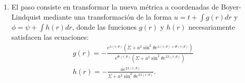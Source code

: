 \begin{enumerate}[1]
    \item El paso consiste en transformar la nueva métrica a coordenadas de Boyer-Lindquist mediante una transformación de la forma $u=t+\int g(r) d r$ y $\phi=\psi+\int h(r) d r$, donde las funciones $g(r)$ y $h(r)$ necesariamente satisfacen las ecuaciones:
        \begin{equation}
            \begin{array}{l}
            g(r)=-\frac{e^{\lambda(r, \theta)}\left(\Sigma+a^2 \sin ^2 \theta e^{\lambda(r, \theta)+\Phi(r, \theta)}\right)}{e^{\Phi(r, \theta)}\left(\Sigma+a^2 \sin ^2 \theta e^{2 \lambda(r, \theta)}\right)} \\
            h(r)=-\frac{a e^{2 \lambda(r, \theta)}}{\Sigma+a^2 \sin ^2 \theta e^{2 \lambda(r, \theta)}} .
            \end{array}
        \end{equation}

\end{enumerate}
